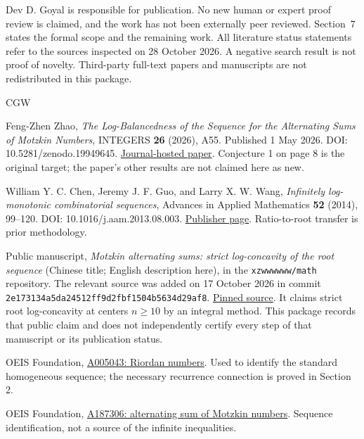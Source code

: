 \documentclass[
  11pt,
  a4paper,
]{article}
\begin{document}
Dev D. Goyal is responsible for publication. No new human or expert proof
review is claimed, and the work has not been externally peer reviewed.
Section~7 states the formal scope and the remaining work. All literature
status statements refer to the sources inspected on 28 October 2026. A
negative search result is not proof of novelty. Third-party full-text
papers and manuscripts are not redistributed in this package.

\begin{thebibliography}{CGW}

 Feng-Zhen Zhao, \emph{The Log-Balancedness of the Sequence for
the Alternating Sums of Motzkin Numbers}, INTEGERS \textbf{26} (2026),
A55. Published 1 May 2026. DOI: 10.5281/zenodo.19949645.
\href{https://math.colgate.edu/~integers/aa55/aa55.pdf}{Journal-hosted
paper}. Conjecture 1 on page 8 is the original target; the paper's other
results are not claimed here as new.

 William Y. C. Chen, Jeremy J. F. Guo, and Larry X. W. Wang,
\emph{Infinitely log-monotonic combinatorial sequences}, Advances in
Applied Mathematics \textbf{52} (2014), 99--120. DOI:
10.1016/j.aam.2013.08.003.
\href{https://www.sciencedirect.com/science/article/pii/S0196885813000973}{Publisher
page}. Ratio-to-root transfer is prior methodology.

 Public manuscript, \emph{Motzkin alternating sums: strict
log-concavity of the root sequence} (Chinese title; English description
here), in the \texttt{xzwwwwww/math} repository. The relevant source was
added on 17 October 2026 in commit
\texttt{2e173134a5da24512ff9d2fbf1504b5634d29af8}.
\href{https://github.com/xzwwwwww/math/blob/2e173134a5da24512ff9d2fbf1504b5634d29af8/Motzkin\%E7\%8C\%9C\%E6\%83\%B3/motzkin_root_log_concavity.tex}{Pinned
source}. It claims strict root log-concavity at centers \(n\ge10\) by an
integral method. This package records that public claim and does not
independently certify every step of that manuscript or its publication
status.

 OEIS Foundation, \href{https://oeis.org/A005043}{A005043:
Riordan numbers}. Used to identify the standard homogeneous sequence;
the necessary recurrence connection is proved in Section 2.

 OEIS Foundation, \href{https://oeis.org/A187306}{A187306:
alternating sum of Motzkin numbers}. Sequence identification, not a
source of the infinite inequalities.

\end{thebibliography}
\end{document}
